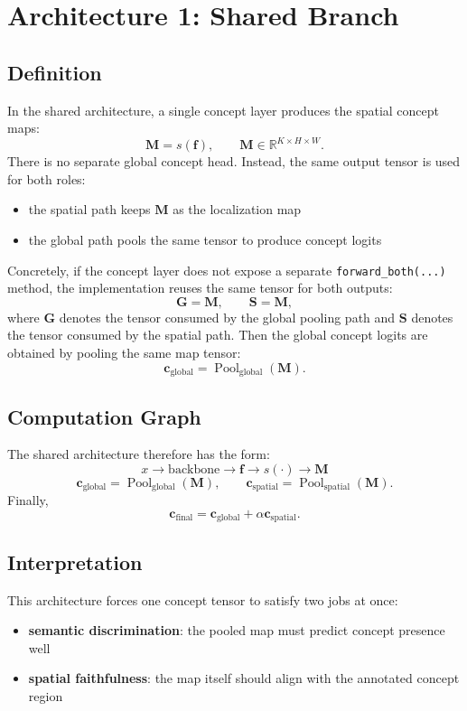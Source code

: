 \documentclass[11pt]{article}
\begin{document}
\section{Architecture 1: Shared Branch}
\subsection{Definition}
In the shared architecture, a single concept layer produces the spatial concept
maps:
\[
\mathbf{M} = s(\mathbf{f}),
\qquad
\mathbf{M} \in \mathbb{R}^{K \times H \times W}.
\]
There is no separate global concept head. Instead, the same output tensor is
used for both roles:
\begin{itemize}
    \item the spatial path keeps $\mathbf{M}$ as the localization map
    \item the global path pools the same tensor to produce concept logits
\end{itemize}

Concretely, if the concept layer does not expose a separate
\texttt{forward\_both(...)} method, the implementation reuses the same tensor
for both outputs:
\[
\mathbf{G} = \mathbf{M},
\qquad
\mathbf{S} = \mathbf{M},
\]
where $\mathbf{G}$ denotes the tensor consumed by the global pooling path and
$\mathbf{S}$ denotes the tensor consumed by the spatial path.
Then the global concept logits are obtained by pooling the same map tensor:
\[
\mathbf{c}_{\mathrm{global}}
=
\operatorname{Pool}_{\mathrm{global}}(\mathbf{M}).
\]

\subsection{Computation Graph}
The shared architecture therefore has the form:
\[
x \rightarrow \text{backbone} \rightarrow \mathbf{f}
\rightarrow s(\cdot) \rightarrow \mathbf{M}
\]
\[
\mathbf{c}_{\mathrm{global}}
=
\operatorname{Pool}_{\mathrm{global}}(\mathbf{M}),
\qquad
\mathbf{c}_{\mathrm{spatial}}
=
\operatorname{Pool}_{\mathrm{spatial}}(\mathbf{M}).
\]
Finally,
\[
\mathbf{c}_{\mathrm{final}}
=
\mathbf{c}_{\mathrm{global}}
+
\alpha \mathbf{c}_{\mathrm{spatial}}.
\]

\subsection{Interpretation}
This architecture forces one concept tensor to satisfy two jobs at once:
\begin{itemize}
    \item \textbf{semantic discrimination}: the pooled map must predict concept
    presence well
    \item \textbf{spatial faithfulness}: the map itself should align with the
    annotated concept region
\end{itemize}
\end{document}
